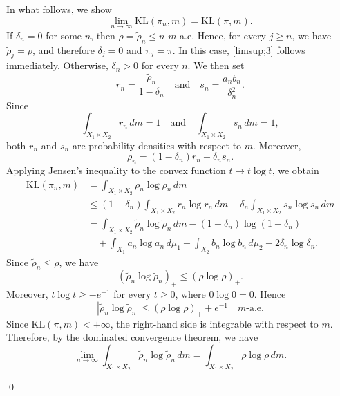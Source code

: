 \documentclass[a4paper,11pt]{article}
\theoremstyle{plain}
\theoremstyle{definition}
\theoremstyle{remark}
\theoremstyle{plain}
\newenvironment{pf}[1]
{{\noindent\textbf{Proof of #1.}}}{\hfill \qed}
\numberwithin{equation}{section}
\newcommand{\dl}{\delta}
\newcommand{\1}{\mbox{1}\hspace{-0.25em}\mbox{l}} %
\begin{document}
\begin{pf}{Theorem \ref{thm;narrow}}
In what follows, we show 
\begin{equation}\label{limsup;3}
\lim_{n\to\infty}\mathrm{KL}(\pi_n,m)=\mathrm{KL}(\pi,m).
\end{equation}
If $\dl_n=0$ for some $n$, then $\rho=\tilde{\rho}_n\leq n$ $m$-a.e. Hence, for every $j\geq n$, we have $\tilde{\rho}_j=\rho$, and therefore $\dl_j=0$ and $\pi_j=\pi$. In this case, \eqref{limsup;3} follows immediately. Otherwise, $\dl_n>0$ for every $n$. We then set
\begin{equation*}
r_n = \frac{\tilde{\rho}_n}{1-\dl_n} \quad\mathrm{and}\quad s_n = \frac{a_nb_n}{\dl_n^2}.
\end{equation*}
Since
\begin{equation*}
\int_{X_1\times X_2}r_n\,dm = 1 \quad\mathrm{and}\quad \int_{X_1\times X_2}s_n\,dm = 1,
\end{equation*}
both $r_n$ and $s_n$ are probability densities with respect to $m$. Moreover,
\begin{equation*}
\rho_n = (1-\dl_n)r_n + \dl_n s_n.
\end{equation*}
Applying Jensen's inequality to the convex function $t\mapsto t\log t$, we obtain
\begin{align*}
\mathrm{KL}(\pi_n,m)
&=\int_{X_1\times X_2}\rho_n\log\rho_n\,dm \\
&\leq (1-\dl_n)\int_{X_1\times X_2}r_n\log r_n\,dm
+\dl_n\int_{X_1\times X_2}s_n\log s_n\,dm \\
&=\int_{X_1\times X_2}\tilde{\rho}_n\log\tilde{\rho}_n\,dm
-(1-\dl_n)\log(1-\dl_n) \\
&\quad +\int_{X_1}a_n\log a_n\,d\mu_1
+\int_{X_2}b_n\log b_n\,d\mu_2
-2\dl_n\log\dl_n.
\end{align*}
Since $\tilde{\rho}_n\leq\rho$, we have
\begin{equation*}
(\tilde{\rho}_n\log\tilde{\rho}_n)_+ \leq (\rho\log\rho)_+.
\end{equation*}
Moreover, $t\log t\geq-e^{-1}$ for every $t\geq0$, where $0\log0=0$. Hence
\begin{equation*}
\left|\tilde{\rho}_n\log\tilde{\rho}_n\right| \leq (\rho\log\rho)_+ + e^{-1} \quad m\text{-a.e.}
\end{equation*}
Since $\mathrm{KL}(\pi,m)<+\infty$, the right-hand side is integrable with respect to $m$. Therefore, by the dominated convergence theorem, we have
\begin{equation*}
\lim_{n\to\infty}\int_{X_1\times X_2}\tilde{\rho}_n\log\tilde{\rho}_n\,dm = \int_{X_1\times X_2}\rho\log\rho\,dm.
\end{equation*}

\end{pf}
\end{document}
